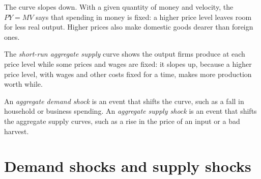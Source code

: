 The  curve slopes down. With a given quantity of money and velocity, the  $PY = MV$ says that spending in money is fixed: a higher price
level leaves room for less real output. Higher prices also make domestic goods dearer than foreign ones.

\begin{definition}\label{def:g12:aggregate-demand-and-supply:sras}
The \emph{short-run aggregate supply} curve shows the output firms produce at each price level while some prices and wages are fixed:
it slopes up, because a higher price level, with wages and other costs fixed for a time, makes more production worth while.
\end{definition}

\begin{definition}\label{def:g12:aggregate-demand-and-supply:ad-shock}
An \emph{aggregate demand shock} is an event that shifts the  curve, such as a fall in household or business spending. An
\emph{aggregate supply shock}\label{def:g12:aggregate-demand-and-supply:as-shock} is an event that shifts the aggregate supply
curves, such as a rise in the price of an input or a bad harvest.
\end{definition}

\section{Demand shocks and supply shocks}\label{sec:g12:aggregate-demand-and-supply:shocks}

